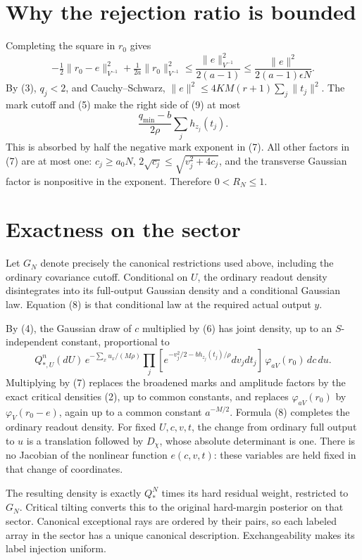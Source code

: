 \documentclass[11pt]{article}
\begin{document}
\section{Why the rejection ratio is bounded}
Completing the square in $r_0$ gives
\[
 -\tfrac12\|r_0-e\|_{V^{-1}}^2
            +\tfrac1{2a}\|r_0\|_{V^{-1}}^2
 \le\frac{\|e\|_{V^{-1}}^2}{2(a-1)}
 \le\frac{\|e\|^2}{2(a-1)\epsilon N}.                  \tag{9}
\]
By (3), $q_j<2$, and Cauchy--Schwarz,
$\|e\|^2\le4KM(r+1)\sum_j\|t_j\|^2$.
The mark cutoff and (5) make the right side of (9) at most
\[
               \frac{q_{\min}-b}{2\rho}\sum_jh_{z_j}(t_j).
\]
This is absorbed by half the negative mark exponent in (7). All other
factors in (7) are at most one: $c_j\ge a_0N$,
$2\sqrt{c_j}\le\sqrt{v_j^2+4c_j}$, and the transverse Gaussian
factor is nonpositive in the exponent. Therefore $0<R_N\le1$.

\section{Exactness on the sector}
Let $G_N$ denote precisely the canonical restrictions used above,
including the ordinary covariance cutoff. Conditional on $U$, the
ordinary readout density disintegrates into its full-output Gaussian
density and a conditional Gaussian law. Equation (8) is that conditional
law at the required actual output $y$.

By (4), the Gaussian draw of $c$ multiplied by (6) has joint density,
up to an $S$-independent constant, proportional to
\[
 Q_{*,U}^n(dU)\,e^{-\sum_xu_x/(M\rho)}
 \prod_j[e^{-v_j^2/2-bh_{z_j}(t_j)/\rho}dv_jdt_j]\,
                        \varphi_{aV}(r_0)\,dc\,du.      \tag{10}
\]
Multiplying by (7) replaces the broadened marks and amplitude factors
by the exact critical densities (2), up to common constants, and replaces
$\varphi_{aV}(r_0)$ by $\varphi_V(r_0-e)$, again up to a common
constant $a^{-M/2}$. Formula (8) completes the ordinary readout density.
For fixed $U,c,v,t$, the change from ordinary full output to $u$ is a
translation followed by $D_\chi$, whose absolute determinant is one.
There is no Jacobian of the nonlinear function $e(c,v,t)$: these variables
are held fixed in that change of coordinates.

The resulting density is exactly $Q_*^N$ times its hard residual weight,
restricted to $G_N$. Critical tilting converts this to the original
hard-margin posterior on that sector. Canonical exceptional rays are
ordered by their pairs, so each labeled array in the sector has a unique
canonical description. Exchangeability makes its label injection uniform.
\end{document}
